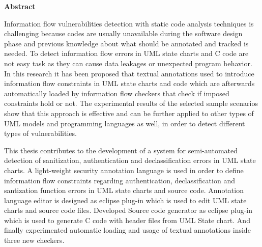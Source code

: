

\clearemptydoublepage
{}
{}	





\vspace*{2cm}
\begin{center}
{\Large \bf Abstract}
\end{center}
\vspace{1cm}

Information flow vulnerabilities detection with static code analysis techniques is challenging because codes are usually unavailable during  the software design phase and
previous knowledge about what should be annotated and tracked
is needed. To detect information flow errors in UML state
charts and C code are not easy task as they can cause data leakages or unexpected program behavior. In this research it has been proposed that textual annotations used to
introduce information flow constraints in UML state charts and code which are afterwards automatically loaded by information flow checkers that check if imposed constraints hold or not. The experimental results of the selected sample scenarios show that this approach
is effective and can be further applied to other types of UML
models and programming languages as well, in order to detect
different types of vulnerabilities.

This thesis contributes to the development of a system for semi-automated detection of sanitization, authentication and declassification errors in UML state charts. A light-weight security annotation language is used in order to define information flow constraints regarding authentication, declassification and santization function errors  in UML state charts and source code. Annotation language editor is designed as eclipse
plug-in which is used to edit UML state charts and
source code files. Developed Source code generator as eclipse plug-in which is used to generate C code with header files from UML State chart. And finally experimented automatic loading and usage of textual annotations inside three new checkers.